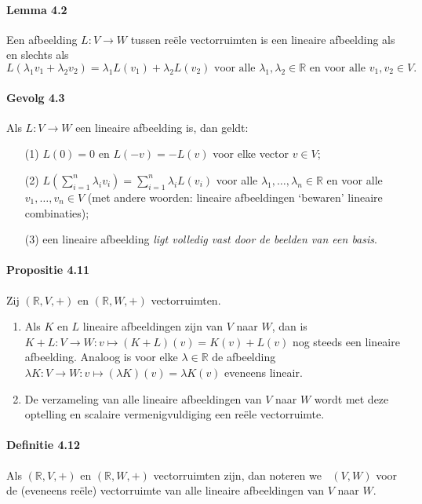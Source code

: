 \documentclass[11pt,oneside,a4paper]{article}
\DeclareMathOperator{\rhom}{Hom_\mathbb{R}}
\begin{document}
	\paragraph{Lemma 4.2}
		Een afbeelding $L: V \to W$ tussen reële vectorruimten is een lineaire afbeelding als en slechts als $$L(\lambda_1 v_1 + \lambda_2 v_2) = \lambda_1 L(v_1 )+ \lambda_2 L(v_2) \text{ voor alle } \lambda_1, \lambda_2 \in \mathbb{R} \text{ en voor alle } v_1, v_2 \in V.$$
	\paragraph{Gevolg 4.3}
		Als $L: V \to W$ een lineaire afbeelding is, dan geldt:
		\begin{enumerate}
			\item[(1)] $L(0) = 0$ en $L(-v) = -L(v)$ voor elke vector $v \in V$;
			\item[(2)] $L(\sum_{i=1}^{n} \lambda_i v_i) = \sum_{i=1}^{n} \lambda_i L(v_i)$ voor alle $\lambda_1, \ldots , \lambda_n \in \mathbb{R}$ en voor alle $v_1, \ldots , v_n \in V$ (met andere woorden: lineaire afbeeldingen `bewaren' lineaire combinaties);
			\item[(3)] een lineaire afbeelding \textit{ligt volledig vast door de beelden van een basis}.
		\end{enumerate}
	\paragraph{Propositie 4.11}
		Zij $(\mathbb{R}, V, +)$ en $(\mathbb{R}, W, +)$ vectorruimten.
		\begin{enumerate}
			\item Als $K$ en $L$ lineaire afbeeldingen zijn van $V$ naar $W$, dan is $K+L:V \to W:v \mapsto (K+L)(v) = K(v) + L(v)$ nog steeds een lineaire afbeelding. Analoog is voor elke $\lambda \in \mathbb{R}$ de afbeelding $\lambda K: V \to W: v \mapsto (\lambda K)(v) = \lambda K(v)$ eveneens lineair.
			\item De verzameling van alle lineaire afbeeldingen van $V$ naar $W$ wordt met deze optelling en scalaire vermenigvuldiging een reële vectorruimte. 
		\end{enumerate}
	\paragraph{Definitie 4.12}
		Als $(\mathbb{R}, V, +)$ en $(\mathbb{R}, W, +)$ vectorruimten zijn, dan noteren we $\rhom(V, W)$ voor de (eveneens reële) vectorruimte van alle lineaire afbeeldingen van $V$ naar $W$.
\end{document}
